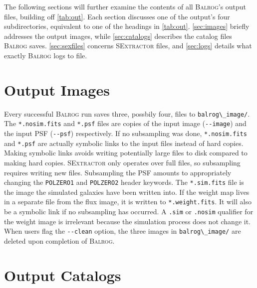 \documentclass[12pt]{book}
\newcommand{\codett}[1]{\lstinline{#1}}
\newcommand{\balrog}{\textsc{Balrog}}
\newcommand{\sex}{\textsc{SExtractor}}
\newcommand{\opt}[1]{\codett{--#1}}
\begin{document}
The following sections will further examine the contents of 
all \balrog{}'s output files, building off \autoref{tab:out}.
Each section discusses one of the output's four subdirectories,
equivalent to one of the headings in \autoref{tab:out}.
\autoref{sec:images} briefly addresses the output images,
while \autoref{sec:catalogs} describes the catalog files \balrog{} saves.
\autoref{sec:sexfiles} concerns \sex{} files, and
\autoref{sec:logs} details what exactly \balrog{} logs to file.

\section{Output Images}
\label{sec:images}

Every successful \balrog{} run saves three, possbily four, files to \codett{balrog\_image/}.
The \codett{*.nosim.fits} and \codett{*.psf} files are copies of the 
input image (\opt{image}) and the input PSF (\opt{psf}) respectively.
If no subsampling was done, \codett{*.nosim.fits} and \codett{*.psf} are actually symbolic links
to the input files instead of hard copies. Making symbolic links avoids
writing potentially large files to disk compared to making hard copies.
\sex{} only operates over full files, so subsampling requires writing new files.
Subsampling the PSF amounts to appropriately changing the 
\codett{POLZERO1} and \codett{POLZERO2} header keywords.
The \codett{*.sim.fits} file is the image the simulated galaxies have been written into.
If the weight map lives in a separate file from the flux image, it is
written to \codett{*.weight.fits}. 
It will also be a symbolic link if no subsampling has occurred.
A \codett{.sim} or \codett{.nosim} qualifier for the weight image is irrelevant
because the simulation process does not change it.
When users flag the \opt{clean} option, the three images in \codett{balrog\_image/}
are deleted upon completion of \balrog{}.


\section{Output Catalogs}
\label{sec:catalogs}
\end{document}
